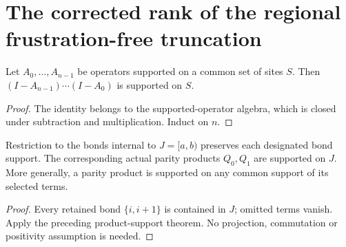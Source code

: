 \section{The corrected rank of the regional frustration-free truncation}

\begin{lemma}
    \label{thm:physical_complementary_product_support}
    \leanok
    Let $A_0,\ldots,A_{n-1}$ be operators supported on a common set
    of sites $S$. Then $(I-A_{n-1})\cdots(I-A_0)$ is supported on $S$.
\end{lemma}
\begin{proof}
    \leanok
    The identity belongs to the supported-operator algebra, which is
    closed under subtraction and multiplication. Induct on $n$.
\end{proof}

\begin{lemma}
    \label{thm:physical_regional_parity_support}
    \leanok
    Restriction to the bonds internal to $J=[a,b)$ preserves each
    designated bond support. The corresponding actual parity products
    $Q_0,Q_1$ are supported on $J$. More generally, a parity product is
    supported on any common support of its selected terms.
\end{lemma}
\begin{proof}
    \leanok
    Every retained bond $\{i,i+1\}$ is contained in $J$; omitted terms
    vanish. Apply the preceding product-support theorem. No projection,
    commutation or positivity assumption is needed.
\end{proof}

